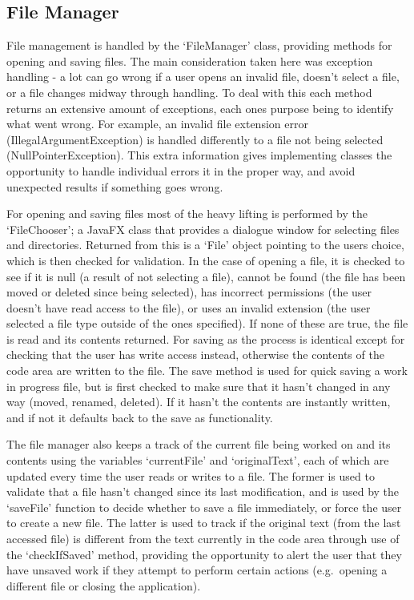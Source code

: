 \documentclass[
]{report}
\begin{document}
\subsection{File Manager}
File management is handled by the `FileManager' class, providing methods
for opening and saving files. The main consideration taken here was
exception handling - a lot can go wrong if a user opens an invalid file,
doesn't select a file, or a file changes midway through handling. To
deal with this each method returns an extensive amount of exceptions,
each ones purpose being to identify what went wrong. For example, an
invalid file extension error (IllegalArgumentException) is handled
differently to a file not being selected (NullPointerException). This
extra information gives implementing classes the opportunity to handle
individual errors it in the proper way, and avoid unexpected results if
something goes wrong.

For opening and saving files most of the heavy lifting is performed by
the `FileChooser'; a JavaFX class that provides a dialogue window for
selecting files and directories. Returned from this is a `File' object
pointing to the users choice, which is then checked for validation. In
the case of opening a file, it is checked to see if it is null (a result
of not selecting a file), cannot be found (the file has been moved or
deleted since being selected), has incorrect permissions (the user
doesn't have read access to the file), or uses an invalid extension (the
user selected a file type outside of the ones specified). If none of
these are true, the file is read and its contents returned. For saving
as the process is identical except for checking that the user has write
access instead, otherwise the contents of the code area are written to
the file. The save method is used for quick saving a work in progress
file, but is first checked to make sure that it hasn't changed in any
way (moved, renamed, deleted). If it hasn't the contents are instantly
written, and if not it defaults back to the save as functionality.

The file manager also keeps a track of the current file being worked on
and its contents using the variables `currentFile' and `originalText',
each of which are updated every time the user reads or writes to a file.
The former is used to validate that a file hasn't changed since its last
modification, and is used by the `saveFile' function to decide whether
to save a file immediately, or force the user to create a new file. The
latter is used to track if the original text (from the last accessed
file) is different from the text currently in the code area through use
of the `checkIfSaved' method, providing the opportunity to alert the
user that they have unsaved work if they attempt to perform certain
actions (e.g.~opening a different file or closing the application).
\end{document}
